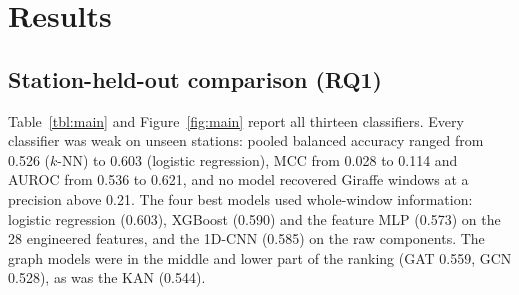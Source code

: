 \documentclass[a4paper,fleqn]{cas-dc}
\begin{document}
\section{Results}\label{sec:results}

\subsection{Station-held-out comparison (RQ1)}\label{sec:res-main}
Table~\ref{tbl:main} and Figure~\ref{fig:main} report all thirteen classifiers. Every
classifier was weak on unseen stations: pooled balanced accuracy ranged from 0.526
($k$-NN) to 0.603 (logistic regression), MCC from 0.028 to 0.114 and AUROC from 0.536 to
0.621, and no model recovered Giraffe windows at a precision above 0.21. The four best
models used whole-window information: logistic regression (0.603), XGBoost (0.590) and
the feature MLP (0.573) on the 28 engineered features, and the 1D-CNN (0.585) on the raw
components. The graph models were in the middle and lower part of the ranking (GAT
0.559, GCN 0.528), as was the KAN (0.544).
\end{document}

